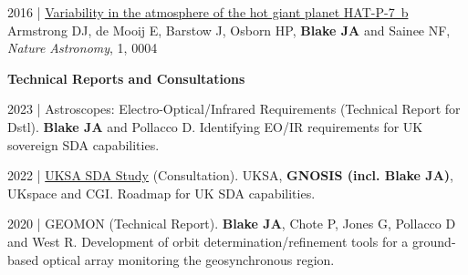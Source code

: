 \documentclass[10pt,a4paper]{altacv}
\begin{document}
\smallskip 

\small 
2016 | \href{https://www.nature.com/articles/s41550-016-0004}{Variability in the atmosphere of the hot giant planet HAT-P-7~b}
Armstrong DJ, de Mooij E, Barstow J, Osborn HP, \textbf{Blake JA} and Sainee NF, \textit{Nature Astronomy}, 1, 0004 

\divider

\normalsize \textbf{Technical Reports and Consultations} 

\medskip

\small
2023 | Astroscopes: Electro-Optical/Infrared Requirements (Technical Report for Dstl).
\textbf{Blake JA} and Pollacco D. Identifying EO/IR requirements for UK sovereign SDA capabilities.

\smallskip 

\small 
2022 | \href{https://www.ukspace.org/new-space-domain-awareness-study-published/}{UKSA SDA Study} (Consultation).
UKSA, \textbf{GNOSIS (incl. Blake JA)}, UKspace and CGI. Roadmap for UK SDA capabilities.

\smallskip 

\small 
2020 | GEOMON (Technical Report).
\textbf{Blake JA}, Chote P, Jones G, Pollacco D and West R. Development of orbit determination/refinement tools for a ground-based optical array monitoring the geosynchronous region. 
\end{document}
